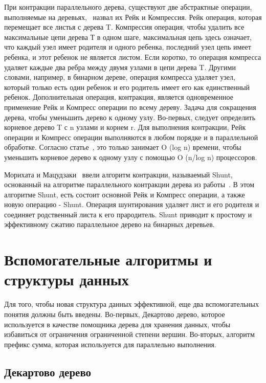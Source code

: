 \documentclass[specification,annotation,times]{itmo-student-thesis}
\newcommand{\revise}[1]{{\color{red!70!black} #1 }}
\begin{document}
\revise{
При контракции параллельного дерева, существуют две абстрактные операции, выполняемые на деревьях,~\cite{miller85} назвал их Рейк и Компрессия. Рейк операция, которая перемещает все листья с 
дерева T. Компрессия операция, чтобы удалить все максимальные цепи дерева Т в одном шаге, максимальная цепь здесь означает, что каждый узел имеет родителя и одного ребенка, последний узел цепь имеет 
ребенка, и этот ребенок не является листом. Если коротко, то операция компресса удаляет каждые два ребра между двумя узлами в цепи дерева T. Другими словами, например, в бинарном дереве, операция 
компресса удаляет узел, который только есть один ребенок и его родитель имеет его как единственный ребенок. Дополнительная операция, контракция, является одновременное применение Рейк и Компресс операции 
по всему дереву. Задача для сокращения дерева, чтобы уменьшить дерево к одному узлу. Во-первых, следует определить корневое дерево T с n узлами и корнем r. Для выполнения контракции, Рейк операции и 
Компресс операции выполняются в любом порядке и в параллельной обработке. Согласно статье~\cite{miller85}, это только занимает O (log n) времени, чтобы уменьшить корневое дерево к одному узлу с 
помощью O (n/log n) процессоров.
}

\revise{
Морихата и Мацудзаки~\cite{morihata08} ввели алгоритм контракции, называемый Shunt, основанный на алгоритме параллельного контракции дерева из работы~\cite{miller85}. В этом алгоритме Shunt, 
есть состоит основной Рейк 
и Компресс операции, а также новую операцию - Shunt. Операция шунтирования удаляет лист и его родителя и соединяет родственный листа к его прародитель. Shunt приводит к простому и эффективному сжатию 
параллельное дерево на бинарных деревьев.
}

\section{Вспомогательные алгоритмы и структуры данных}\label{survey-misc}

\revise{
Для того, чтобы новая структура данных эффективной, еще два вспомогательных понятия должны быть введены. Во-первых, Декартово дерево, которое используется в качестве помощника дерева для хранения данных, 
чтобы избавиться от ограничения ограниченной степени вершин. Во-вторых, алгоритм префикс сумма, которая используется для параллельно выполнения.
}

\subsection{Декартово дерево}
\end{document}
